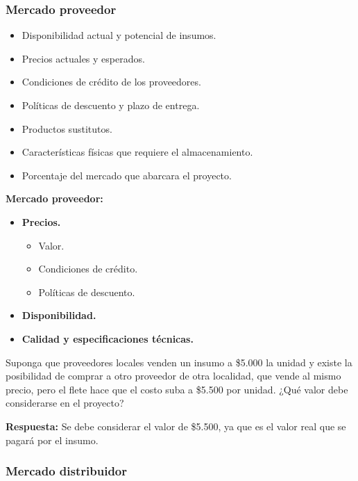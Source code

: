 \documentclass{templateNote}
\begin{document}
\subsubsection*{Mercado proveedor}
\begin{itemize}
    \item Disponibilidad actual y potencial de insumos.
    \item Precios actuales y esperados.
    \item Condiciones de crédito de los proveedores.
    \item Políticas de descuento y plazo de entrega.
    \item Productos sustitutos.
    \item Características físicas que requiere el almacenamiento.
    \item Porcentaje del mercado que abarcara el proyecto.
\end{itemize}

\textbf{Mercado proveedor:}
\begin{itemize}
    \item \textbf{Precios.}
    \begin{itemize}
        \item Valor.
        \item Condiciones de crédito.
        \item Políticas de descuento.
    \end{itemize}
    \item \textbf{Disponibilidad.}
    \item \textbf{Calidad y especificaciones técnicas.}
\end{itemize}

\begin{tcolorbox}[colback=red!5!white,colframe=green!75!black]
    Suponga que proveedores locales venden un insumo a \$5.000 la unidad y existe la posibilidad de comprar a otro proveedor de otra localidad, que vende al mismo precio, pero el flete hace que el costo suba a \$5.500 por unidad. ¿Qué valor debe considerarse en el proyecto?

    \textbf{Respuesta:} Se debe considerar el valor de \$5.500, ya que es el valor real que se pagará por el insumo.
\end{tcolorbox}

\subsubsection*{Mercado distribuidor}
\end{document}
